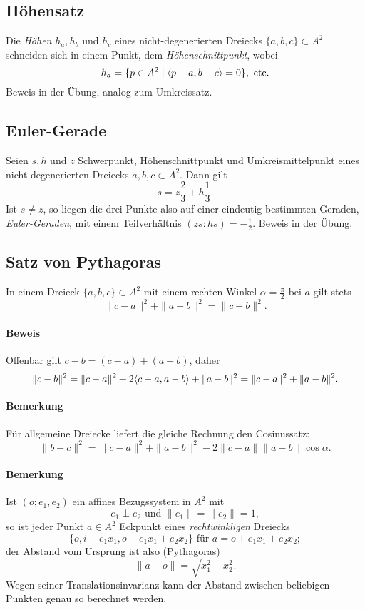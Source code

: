 \subsection{Höhensatz}
	Die \emph{Höhen} $ h_a,h_b $ und $ h_c $ eines nicht-degenerierten Dreiecks $ \{a,b,c\} \subset A^2 $ schneiden sich in einem Punkt, dem \emph{Höhenschnittpunkt}, wobei
		\[ h_a = \{p\in A^2\mid \langle p-a,b-c \rangle = 0 \},\text{ etc.} \]
	Beweis in der Übung, analog zum Umkreissatz.

\subsection{Euler-Gerade}
	Seien $ s, h $ und $ z $ Schwerpunkt, Höhenschnittpunkt und Umkreismittelpunkt eines nicht-degenerierten Dreiecks $ a,b,c\subset A^2 $.
	Dann gilt
		\[ s=z\frac{2}{3}+h\frac{1}{3}. \]
	Ist $ s\neq z $, so liegen die drei Punkte also auf einer eindeutig bestimmten Geraden, \emph{Euler-Geraden}, mit einem Teilverhältnis $ (zs:hs)=-\frac{1}{2} $.
	Beweis in der Übung.

\subsection{Satz von Pythagoras}
	 In einem Dreieck $ \{a,b,c\}\subset A^2 $ mit einem rechten Winkel $ \alpha = \frac{\pi}{2} $ bei $ a $ gilt stets
		 \[ \|c-a\|^2+\|a-b\|^2 = \|c-b\|^2. \]
\paragraph{Beweis}
	Offenbar gilt $ c-b = (c-a)+(a-b) $, daher
		\[ \|c-b\|^2 = \|c-a\|^2 + 2\langle c-a,a-b \rangle+\|a-b\|^2 = \|c-a\|^2+\|a-b\|^2. \]
\paragraph{Bemerkung}
	Für allgemeine Dreiecke liefert die gleiche Rechnung den Cosinussatz:
		\[ \|b-c\|^2 = \|c-a\|^2+\|a-b\|^2- 2\|c-a\|\|a-b\|\cos \alpha. \]
\paragraph{Bemerkung}
	Ist $ (o;e_1,e_2) $ ein affines Bezugssystem in $ A^2 $ mit
		\[ e_1 \perp e_2 \text{ und } \|e_1\| = \|e_2\| = 1, \]
	so ist jeder Punkt $ a\in A^2 $ Eckpunkt eines \emph{rechtwinkligen} Dreiecks
		\[ \{o,i+e_1x_1,o+e_1x_1+e_2x_2\} \text{ für } a = o+e_1x_1+e_2x_2; \]
	der Abstand vom Ursprung ist also (Pythagoras)
		\[ \|a-o\| = \sqrt{x_1^2+x_2^2}. \]
	Wegen seiner Translationsinvarianz kann der Abstand zwischen beliebigen Punkten genau so berechnet werden.
	
